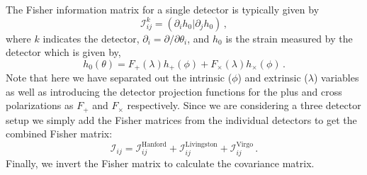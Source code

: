 \documentclass[twocolumn]{aastex631}
\begin{document}
The Fisher information matrix for a single detector is typically given by 
\begin{equation}
    \label{eq:fisher}
    \mathcal{I}^{k}_{ij} = (\partial_i h_0 | \partial_j h_0) \, ,
\end{equation}
where $k$ indicates the detector, $\partial_i = \partial/\partial \theta_i$, and $h_0$ is the strain measured by the detector which is given by,
\begin{equation}
    h_0(\theta) = F_+(\lambda) h_{+}(\phi) + F_\times(\lambda) h_{\times}(\phi) \, .
\end{equation}
Note that here we have separated out the intrinsic ($\phi$) and extrinsic ($\lambda$) variables as well as introducing the detector projection functions for the plus and cross polarizations as $F_+$ and $F_\times$ respectively.
Since we are considering a three detector setup we simply add the Fisher matrices from the individual detectors to get the combined Fisher matrix:
\begin{equation}
    \mathcal{I}_{ij} =  \mathcal{I}^{\mathrm{Hanford}}_{ij} + \mathcal{I}^{\mathrm{Livingston}}_{ij} + \mathcal{I}^{\mathrm{Virgo}}_{ij}   \, .
\end{equation}
Finally, we invert the Fisher matrix to calculate the covariance matrix.

\end{document}
